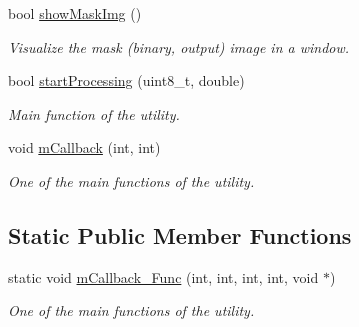 \begin{DoxyCompactItemize}
bool \mbox{\hyperlink{class_visualizer_ac7312a98d67cd0cc8f3d7e99fb5cfca9}{show\+Mask\+Img}} ()
\begin{DoxyCompactList}\small\item\em Visualize the mask (binary, output) image in a window. \end{DoxyCompactList}\item 
bool \mbox{\hyperlink{class_visualizer_ac32b38bcdeeeeb584b7a711ab4b1f5aa}{start\+Processing}} (uint8\+\_\+t, double)
\begin{DoxyCompactList}\small\item\em Main function of the utility. \end{DoxyCompactList}\item 
void \mbox{\hyperlink{class_visualizer_a3fc264f00e663adfcf5abe46bc72933b}{m\+Callback}} (int, int)
\begin{DoxyCompactList}\small\item\em One of the main functions of the utility. \end{DoxyCompactList}\end{DoxyCompactItemize}
\subsection*{Static Public Member Functions}
\begin{DoxyCompactItemize}
\item 
static void \mbox{\hyperlink{class_visualizer_a747f6b8f8d114aa96672220c8f3d8c5d}{m\+Callback\+\_\+\+Func}} (int, int, int, int, void $\ast$)
\begin{DoxyCompactList}\small\item\em One of the main functions of the utility. \end{DoxyCompactList}\end{DoxyCompactItemize}
